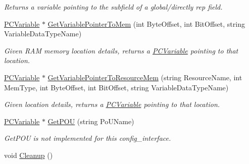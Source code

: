 \begin{DoxyCompactItemize}
\begin{DoxyCompactList}\small\item\em Returns a variable pointing to the subfield of a global/directly rep field. \end{DoxyCompactList}\item 
\hyperlink{classpc__emulator_1_1PCVariable}{P\+C\+Variable} $\ast$ \hyperlink{classpc__emulator_1_1PCConfigurationInterface_acb1683a6a66be801c69c30f36eeaea2f}{Get\+Variable\+Pointer\+To\+Mem} (int Byte\+Offset, int Bit\+Offset, string Variable\+Data\+Type\+Name)
\begin{DoxyCompactList}\small\item\em Given R\+AM memory location details, returns a \hyperlink{classpc__emulator_1_1PCVariable}{P\+C\+Variable} pointing to that location. \end{DoxyCompactList}\item 
\hyperlink{classpc__emulator_1_1PCVariable}{P\+C\+Variable} $\ast$ \hyperlink{classpc__emulator_1_1PCConfigurationInterface_a81941aeda8ffef0e15f3591999c3a58e}{Get\+Variable\+Pointer\+To\+Resource\+Mem} (string Resource\+Name, int Mem\+Type, int Byte\+Offset, int Bit\+Offset, string Variable\+Data\+Type\+Name)
\begin{DoxyCompactList}\small\item\em Given location details, returns a \hyperlink{classpc__emulator_1_1PCVariable}{P\+C\+Variable} pointing to that location. \end{DoxyCompactList}\item 
\hyperlink{classpc__emulator_1_1PCVariable}{P\+C\+Variable} $\ast$ \hyperlink{classpc__emulator_1_1PCConfigurationInterface_a7398812afc40eba633c27f3e4c5afbde}{Get\+P\+OU} (string Po\+U\+Name)\hypertarget{classpc__emulator_1_1PCConfigurationInterface_a7398812afc40eba633c27f3e4c5afbde}{}\label{classpc__emulator_1_1PCConfigurationInterface_a7398812afc40eba633c27f3e4c5afbde}

\begin{DoxyCompactList}\small\item\em Get\+P\+OU is not implemented for this config\+\_\+interface. \end{DoxyCompactList}\item 
void \hyperlink{classpc__emulator_1_1PCConfigurationInterface_aab4b87faab438a8a73c9dc58a741cf90}{Cleanup} ()\hypertarget{classpc__emulator_1_1PCConfigurationInterface_aab4b87faab438a8a73c9dc58a741cf90}{}\label{classpc__emulator_1_1PCConfigurationInterface_aab4b87faab438a8a73c9dc58a741cf90}


\end{DoxyCompactItemize}
